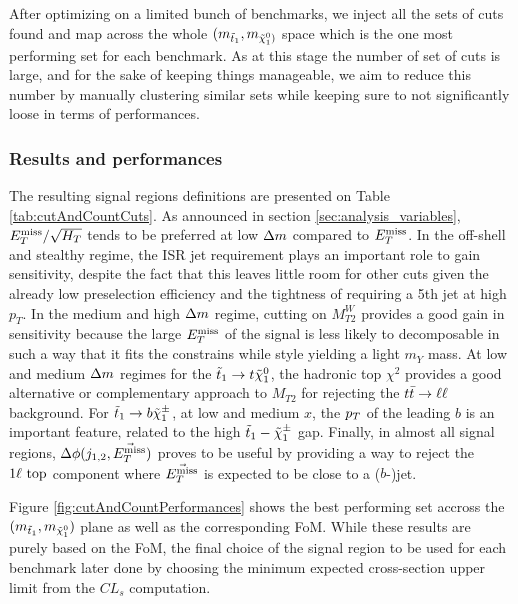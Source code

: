     After optimizing on a limited bunch of benchmarks, we inject all the sets of cuts found
    and map across the whole $(m_{\tilde{t}_1},m_{\tilde{\chi}_1^0)}$ space which is the one
    most performing set for each benchmark. As at this stage the number of set of cuts is 
    large, and for the sake of keeping things manageable, we aim to reduce this number by 
    manually clustering similar sets while keeping sure to not significantly loose in 
    terms of performances. 

            \subsubsection{Results and performances}

    The resulting signal regions definitions are presented on Table \ref{tab:cutAndCountCuts}.
    As announced in section \ref{sec:analysis_variables}, $E_T^\text{miss}/\sqrt{H_T}$ tends to be
    preferred at low $\Delta m$ compared to $E_T^\text{miss}$. In the off-shell and stealthy regime, 
    the ISR jet requirement plays an important role to gain sensitivity, despite the
    fact that this leaves little room for other cuts given the already low preselection
    efficiency and the tightness of requiring a 5th jet at high $p_T$.
    In the medium and high $\Delta m$ regime, cutting on $M_{T2}^W$ provides a good gain 
    in sensitivity because the large $E_T^\text{miss}$ of the signal is less likely to decomposable 
    in such a way that it fits the constrains while style yielding a light $m_Y$ mass. 
    At low and medium $\Delta m$ regimes for the $\tilde{t}_1 \rightarrow t \tilde{\chi}_1^0$, the 
    hadronic top $\chi^2$ provides a good alternative or complementary approach to $M_{T2}$ 
    for rejecting the $t\bar{t} \rightarrow \ell \ell$ background. For $\tilde{t}_1 \rightarrow b \tilde{\chi}_1^\pm$, 
    at low and medium $x$, the $p_T$ of the leading $b$ is an important feature, related 
    to the high $\tilde{t}_1-\tilde{\chi}_1^\pm$ gap. Finally, in almost all signal regions,
    $\Delta\phi(j_{1,2},\vec{E_T^\text{miss}})$ proves to be useful by providing a way to reject the 
    $1\ell~\text{top}$ component where $\vec{E_T^\text{miss}}$ is expected to be close to a ($b$-)jet. 

    Figure \ref{fig:cutAndCountPerformances} shows the best performing set accross the 
    $(m_{\tilde{t}_1},m_{\tilde{\chi}_1^0})$ plane as well as the corresponding FoM. While
    these results are purely based on the FoM, the final choice of the signal region to
    be used for each benchmark later done by choosing the minimum expected cross-section 
    upper limit from the $CL_s$ computation.

